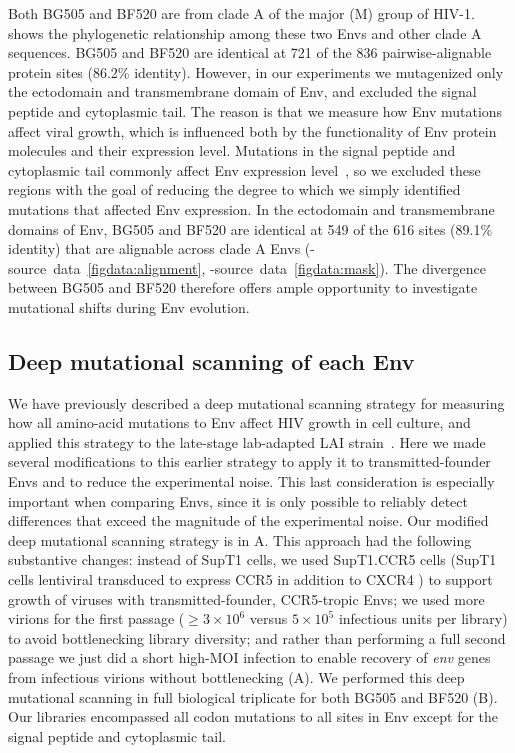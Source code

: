 \documentclass[9pt]{elife}
\begin{document}
Both BG505 and BF520 are from clade A of the major (M) group of HIV-1.
 shows the phylogenetic relationship among these two Envs and other clade A sequences.
BG505 and BF520 are identical at 721 of the 836 pairwise-alignable protein sites (86.2\% identity).
However, in our experiments we mutagenized only the ectodomain and transmembrane domain of Env, and excluded the signal peptide and cytoplasmic tail.
The reason is that we measure how Env mutations affect viral growth, which is influenced both by the functionality of Env protein molecules and their expression level.
Mutations in the signal peptide and cytoplasmic tail commonly affect Env expression level~\citep{chakrabarti1989cytoplasmic,yuste2004modulation,li1994control}, so we excluded these regions with the goal of reducing the degree to which we simply identified mutations that affected Env expression.
In the ectodomain and transmembrane domains of Env, BG505 and BF520 are identical at 549 of the 616 sites (89.1\% identity) that are alignable across clade A Envs (-source~data~\ref{figdata:alignment}, -source~data~\ref{figdata:mask}).
The divergence between BG505 and BF520 therefore offers ample opportunity to investigate mutational shifts during Env evolution.

\subsection{Deep mutational scanning of each Env}
We have previously described a deep mutational scanning strategy for measuring how all amino-acid mutations to Env affect HIV growth in cell culture, and applied this strategy to the late-stage lab-adapted LAI strain~\citep{haddox2016experimental}.
Here we made several modifications to this earlier strategy to apply it to transmitted-founder Envs and to reduce the experimental noise. 
This last consideration is especially important when comparing Envs, since it is only possible to reliably detect differences that exceed the magnitude of the experimental noise. 
Our modified deep mutational scanning strategy is in A.
This approach had the following substantive changes: instead of SupT1 cells, we used SupT1.CCR5 cells (SupT1 cells lentiviral transduced to express CCR5 in addition to CXCR4 \citep{boyd2015mutations}) to support growth of viruses with transmitted-founder, CCR5-tropic Envs; we used more virions for the first passage ($\ge 3 \times 10^6$ versus $5\times 10^5$ infectious units per library) to avoid bottlenecking library diversity; and rather than performing a full second passage we just did a short high-MOI infection to enable recovery of \textit{env} genes from infectious virions without bottlenecking (A).
We performed this deep mutational scanning in full biological triplicate for both BG505 and BF520 (B).
Our libraries encompassed all codon mutations to all sites in Env except for the signal peptide and cytoplasmic tail.
\end{document}
